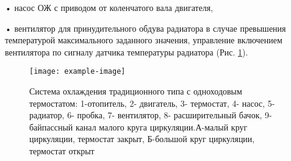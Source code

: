 • насос ОЖ с приводом от коленчатого вала двигателя,

• вентилятор  для принудительного обдува радиатора в случае превышения температурой максимального заданного значения, управление включением вентилятора  по сигналу датчика температуры радиатора (Рис. \ref{схеатермостата}).


\begin{figure}
    \centering
    \texttt{[image: example-image]}
    \caption{ Система охлаждения традиционного типа с одноходовым термостатом: 1-отопитель, 2- двигатель, 3- термостат, 4- насос, 5- радиатор, 6- пробка, 7- вентилятор, 8- расширительный бачок, 9- байпассный канал малого круга циркуляции.А-малый круг циркуляции, термостат закрыт, Б-большой  круг циркуляции, термостат открыт}
    \label{схеатермостата}
\end{figure}

